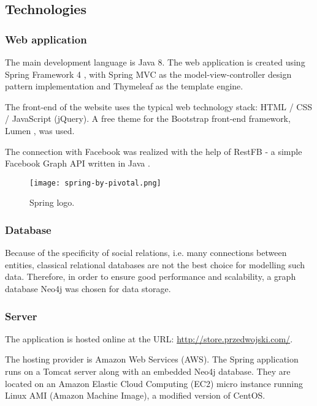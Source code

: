 \documentclass[12pt]{report}
\begin{document}
\subsection{Technologies}
\subsubsection{Web application}
The main development language is Java 8. The web application is created using Spring Framework 4 \cite{spring_framework}, with Spring MVC as the model-view-controller design pattern implementation and Thymeleaf as the template engine. 

The front-end of the website uses the typical web technology stack: HTML / CSS / JavaScript (jQuery). A free theme for the Bootstrap front-end framework, Lumen \cite{lumen}, was used.

The connection with Facebook was realized with the help of RestFB - a simple Facebook Graph API written in Java \cite{restfb}.

\begin{figure}[!t]
\centering
\texttt{[image: spring-by-pivotal.png]} 
\caption[Spring logo.]{Spring logo.\footnotemark}
\label{fig.spring.logo}
\end{figure}

\subsubsection{Database}

Because of the specificity of social relations, i.e. many connections between entities, classical relational databases are not the best choice for modelling such data. Therefore, in order to ensure good performance and scalability, a graph database Neo4j \cite{neo4j} was chosen for data storage.

\subsubsection{Server}

The application is hosted online at the URL: \url{http://store.przedwojski.com/}. 

The hosting provider is Amazon Web Services (AWS). The Spring application runs on a Tomcat server along with an embedded Neo4j database. They are located on an Amazon Elastic Cloud Computing (EC2) micro instance running Linux AMI (Amazon Machine Image), a modified version of CentOS.
\end{document}
